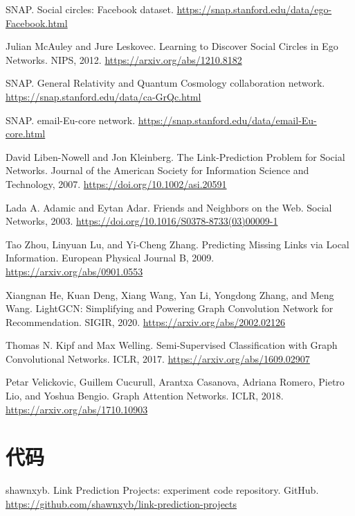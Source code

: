 \documentclass[UTF8,zihao=-4]{ctexart}
\begin{document}
\begin{enumerate}[label={[\arabic*]}]
  \item SNAP. Social circles: Facebook dataset. \url{https://snap.stanford.edu/data/ego-Facebook.html}
  \item Julian McAuley and Jure Leskovec. Learning to Discover Social Circles in Ego Networks. NIPS, 2012. \url{https://arxiv.org/abs/1210.8182}
  \item SNAP. General Relativity and Quantum Cosmology collaboration network. \url{https://snap.stanford.edu/data/ca-GrQc.html}
  \item SNAP. email-Eu-core network. \url{https://snap.stanford.edu/data/email-Eu-core.html}
  \item David Liben-Nowell and Jon Kleinberg. The Link-Prediction Problem for Social Networks. Journal of the American Society for Information Science and Technology, 2007. \url{https://doi.org/10.1002/asi.20591}
  \item Lada A. Adamic and Eytan Adar. Friends and Neighbors on the Web. Social Networks, 2003. \url{https://doi.org/10.1016/S0378-8733(03)00009-1}
  \item Tao Zhou, Linyuan Lu, and Yi-Cheng Zhang. Predicting Missing Links via Local Information. European Physical Journal B, 2009. \url{https://arxiv.org/abs/0901.0553}
  \item Xiangnan He, Kuan Deng, Xiang Wang, Yan Li, Yongdong Zhang, and Meng Wang. LightGCN: Simplifying and Powering Graph Convolution Network for Recommendation. SIGIR, 2020. \url{https://arxiv.org/abs/2002.02126}
  \item Thomas N. Kipf and Max Welling. Semi-Supervised Classification with Graph Convolutional Networks. ICLR, 2017. \url{https://arxiv.org/abs/1609.02907}
  \item Petar Velickovic, Guillem Cucurull, Arantxa Casanova, Adriana Romero, Pietro Lio, and Yoshua Bengio. Graph Attention Networks. ICLR, 2018. \url{https://arxiv.org/abs/1710.10903}
\end{enumerate}

\section{代码}
shawnxyb. Link Prediction Projects: experiment code repository. GitHub. \url{https://github.com/shawnxyb/link-prediction-projects}
\end{document}
